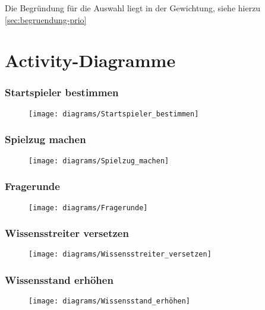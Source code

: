 Die Begründung für die Auswahl liegt in der Gewichtung, siehe hierzu \ref{sec:begruendung-prio}

\newpage
\section{Activity-Diagramme}
\subsubsection{Startspieler bestimmen}
\begin{figure}[h]
  \begin{center}
    \texttt{[image: diagrams/Startspieler\_bestimmen]}
  \end{center}
\end{figure}

\newpage
\subsubsection{Spielzug machen}
\begin{figure}[h]
  \begin{center}
    \texttt{[image: diagrams/Spielzug\_machen]}
  \end{center}
\end{figure}

\newpage
\subsubsection{Fragerunde}
\begin{figure}[h]
  \begin{center}
    \texttt{[image: diagrams/Fragerunde]}
  \end{center}
\end{figure}

\newpage
\subsubsection{Wissensstreiter versetzen}
\begin{figure}[h]
  \begin{center}
    \texttt{[image: diagrams/Wissensstreiter\_versetzen]}
  \end{center}
\end{figure}

\newpage
\subsubsection{Wissensstand erhöhen}
\begin{figure}[h]
  \begin{center}
    \texttt{[image: diagrams/Wissensstand\_erhöhen]}
  \end{center}
\end{figure}

